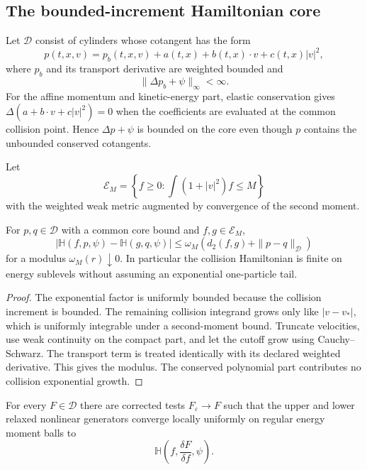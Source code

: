 \subsection{The bounded-increment Hamiltonian core}

Let \(\mathscr D\) consist of cylinders whose cotangent has the form
\[
 p(t,x,v)=p_b(t,x,v)+a(t,x)+b(t,x)\cdot v+c(t,x)|v|^2,
\]
where \(p_b\) and its transport derivative are weighted bounded and
\[
 \|\Delta p_b+\psi\|_\infty<\infty.
\]
For the affine momentum and kinetic-energy part, elastic conservation gives
\(\Delta(a+b\cdot v+c|v|^2)=0\) when the coefficients are evaluated at the
common collision point.  Hence \(\Delta p+\psi\) is bounded on the core even
though \(p\) contains the unbounded conserved cotangents.

Let
\[
 \mathcal E_M=\left\{f\ge0:
 \int(1+|v|^2)f\le M\right\}
\]
with the weighted weak metric augmented by convergence of the second moment.

\begin{lemma}
\label{lem:r5-b4-hamiltonian}
For \(p,q\in\mathscr D\) with a common core bound and
\(f,g\in\mathcal E_M\),
\[
 |\mathbb H(f,p,\psi)-\mathbb H(g,q,\psi)|
 \le \omega_M\left(d_2(f,g)+
  \|p-q\|_{\mathscr D}\right)
\]
for a modulus \(\omega_M(r)\downarrow0\).  In particular the collision
Hamiltonian is finite on energy sublevels without assuming an exponential
one-particle tail.
\end{lemma}

\begin{proof}
The exponential factor is uniformly bounded because the collision increment
is bounded.  The remaining collision integrand grows only like
\(|v-v_*|\), which is uniformly integrable under a second-moment bound.
Truncate velocities, use weak continuity on the compact part, and let the
cutoff grow using Cauchy--Schwarz.  The transport term is treated identically
with its declared weighted derivative.  This gives the modulus.  The
conserved polynomial part contributes no collision exponential growth.
\end{proof}

\begin{theorem}
\label{thm:r5-b4-generator}
For every \(F\in\mathscr D\) there are corrected tests
\(F_\varepsilon\to F\) such that the upper and lower relaxed nonlinear
generators converge locally uniformly on regular energy moment balls to
\[
 \mathbb H\left(f,\frac{\delta F}{\delta f},\psi\right).
\]
\end{theorem}

